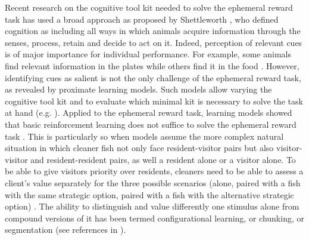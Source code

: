 \documentclass[]{rsos}%
\begin{document}
Recent research on the cognitive tool kit needed to solve the ephemeral
reward task has used a broad approach as proposed by Shettleworth
\citep{shettleworth_Cognition_2009}, who defined cognition as including
all ways in which animals acquire information
through the senses, process, retain and decide to act on it.
Indeed, perception of relevant cues is of major importance
for individual performance. For example, some animals find relevant
information in the plates
\citep{wismer_Cuebased_2019} while others find it in the food
\citep{pretot_Comparative_2021, pretot_Comparing_2016}. However, identifying
cues as salient is not the only challenge of the ephemeral reward task,
as revealed by proximate learning models. Such models allow varying the
cognitive tool kit and to evaluate which minimal kit is necessary to solve
the task at hand (e.g. \citep{dubois_Model_2021}). Applied to the ephemeral
reward task, learning models showed that basic reinforcement learning does
not suffice to solve the ephemeral reward task \citep{prat_Modelling_2022, quinones_Reinforcement_2019}.
This is particularly so when models assume the more complex natural
situation in which cleaner fish not only face resident-visitor pairs but also
visitor-visitor and resident-resident pairs, as well a resident alone or
a visitor alone. To be able to give visitors priority over residents,
cleaners need to be able to assess a client's value separately for the
three possible scenarios (alone, paired with a fish with the
same strategic option, paired with a fish with the alternative strategic option)
\citep{quinones_Reinforcement_2019}. The ability to distinguish and value differently
one stimulus alone from compound versions of it has been termed
configurational learning, or chunking,
or segmentation (see references in \citep{prat_Modelling_2022}).
\end{document}
